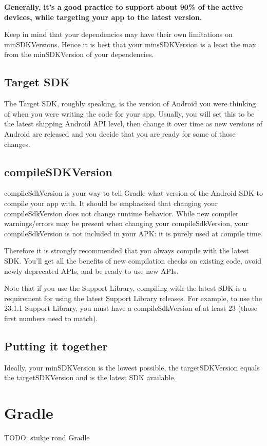 \textbf{Generally, it’s a good practice to support about 90\% of the active devices, while targeting your app to the latest version.}

Keep in mind that your dependencies may have their own limitations on minSDKVersions. Hence it is best that your minsSDKVersion is a least the max from the minSDKVersion of your dependencies.

\subsection{Target SDK}
The Target SDK, roughly speaking, is the version of Android you were thinking of when you were writing the code for your app. Usually, you will set this to be the latest shipping Android API level, then change it over time as new versions of Android are released and you decide that you are ready for some of those changes.

\subsection{compileSDKVersion}
compileSdkVersion is your way to tell Gradle what version of the Android SDK to compile your app with. 
It should be emphasized that changing your compileSdkVersion does not change runtime behavior. While new compiler warnings/errors may be present when changing your compileSdkVersion, your compileSdkVersion is not included in your APK: it is purely used at compile time. 

Therefore it is strongly recommended that you always compile with the latest SDK. You’ll get all the benefits of new compilation checks on existing code, avoid newly deprecated APIs, and be ready to use new APIs.

Note that if you use the Support Library, compiling with the latest SDK is a requirement for using the latest Support Library releases. For example, to use the 23.1.1 Support Library, you must have a compileSdkVersion of at least 23 (those first numbers need to match). 

\subsection{Putting it together}
Ideally, your minSDKVersion is the lowest possible, the targetSDKVersion equals the targetSDKVersion and is the latest SDK available.

\section{Gradle}
TODO: stukje rond Gradle


